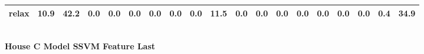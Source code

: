 \documentclass{article}
\begin{document}
\begin{sideways}
\begin{tabular}{lrrrrrrrrrrrrrrrrrr}
relax                         &        10.9 &               42.2 &           0.0 &                          0.0 &                0.0 &                0.0 &                        0.0 &          0.0 &             11.5 &                0.0 &                    0.0 &                      0.0 &                  0.0 &                   0.0 &              0.0 &              0.0 &                                  0.4 &         34.9 \\
\bottomrule
\end{tabular}
\end{sideways}
\normalsize
\vspace{1cm}\\
\textbf{House C Model SSVM Feature Last}\\
\vspace{1cm}\\
\end{document}
